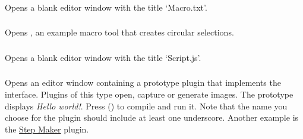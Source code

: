 

\subsubsection{\protect{}\label{sub:NewMacro}}

Opens a blank editor window with the title `Macro.txt'.




\subsubsection[\protect\userinterface{Macro Tool}]{\protect{}\label{sub:NewMacroTool}}

Opens ,
an example macro tool that creates circular selections.




\subsubsection{\protect{}\label{sub:JavaScript}}

Opens a blank editor window with the title `Script.js'.




\subsubsection{\protect{}\label{sub:Plugin}}

Opens an editor window containing a prototype plugin that implements
the  interface. Plugins of this type open, capture or
generate images. The prototype displays \emph{Hello world!}. Press
  ()
to compile and run it. Note that the name you choose for the plugin
should include at least one underscore. Another example is the \href{http://imagej.nih.gov/ij/plugins/steps.html}{Step Maker}
plugin.


